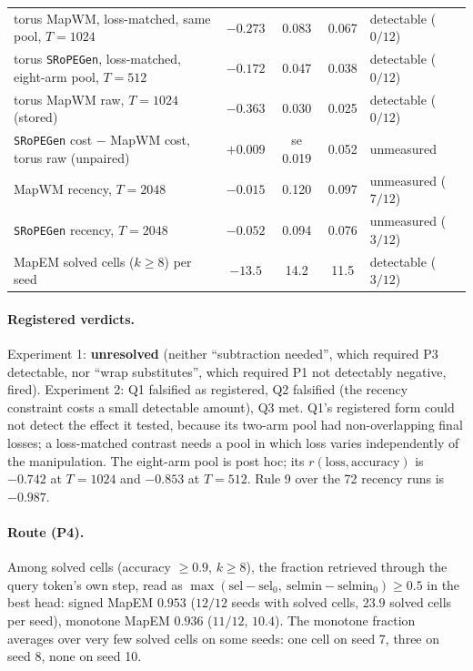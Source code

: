 \documentclass[10pt]{article}
\newcommand{\arm}[1]{\texttt{#1}}
\begin{document}
\begin{table}[h]
\begin{tabular}{@{}lcccl@{}}
torus MapWM, loss-matched, same pool, $T=1024$ & $-0.273$ & 0.083 & 0.067 & detectable ($0/12$) \\
torus \arm{SRoPEGen}, loss-matched, eight-arm pool, $T=512$ & $-0.172$ & 0.047 & 0.038 & detectable ($0/12$) \\
torus MapWM raw, $T=1024$ (stored) & $-0.363$ & 0.030 & 0.025 & detectable ($0/12$) \\
\arm{SRoPEGen} cost $-$ MapWM cost, torus raw (unpaired) & $+0.009$ & se 0.019 & 0.052 & unmeasured \\
MapWM recency, $T=2048$ & $-0.015$ & 0.120 & 0.097 & unmeasured ($7/12$) \\
\arm{SRoPEGen} recency, $T=2048$ & $-0.052$ & 0.094 & 0.076 & unmeasured ($3/12$) \\
MapEM solved cells ($k\ge8$) per seed & $-13.5$ & 14.2 & 11.5 & detectable ($3/12$) \\
\bottomrule
\end{tabular}
\end{table}

\paragraph{Registered verdicts.} Experiment 1: \textbf{unresolved} (neither ``subtraction needed'', which required
P3 detectable, nor ``wrap substitutes'', which required P1 not detectably negative, fired). Experiment 2: Q1
falsified as registered, Q2 falsified (the recency constraint costs a small detectable amount), Q3 met. Q1's
registered form could not detect the effect it tested, because its two-arm pool had non-overlapping final losses;
a loss-matched contrast needs a pool in which loss varies independently of the manipulation. The eight-arm pool
is post hoc; its $r(\text{loss},\text{accuracy})$ is $-0.742$ at $T=1024$ and $-0.853$ at $T=512$. Rule 9 over the
72 recency runs is $-0.987$. %

\paragraph{Route (P4).} Among solved cells (accuracy $\ge0.9$, $k\ge8$), the fraction retrieved through the
query token's own step, read as $\max(\mathrm{sel}-\mathrm{sel}_0,\ \mathrm{selmin}-\mathrm{selmin}_0)\ge0.5$ in
the best head: signed MapEM $0.953$ ($12/12$ seeds with solved cells, $23.9$ solved cells per seed), monotone
MapEM $0.936$ ($11/12$, $10.4$). The monotone fraction averages over very few solved cells on some seeds: one
cell on seed 7, three on seed 8, none on seed 10. %



\end{document}
